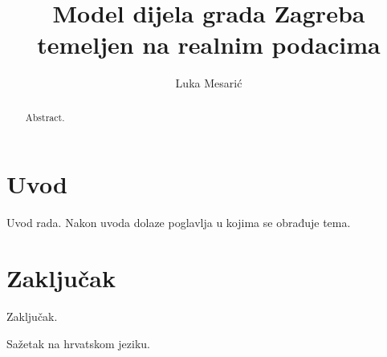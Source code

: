 \documentclass[times, utf8, zavrsni, numeric]{fer}
\begin{document}
\nocite{*}


\title{Model dijela grada Zagreba temeljen na realnim podacima}

\author{Luka Mesarić}

\maketitle

\izvornik

\zahvala{}

\tableofcontents

\chapter{Uvod}
Uvod rada. Nakon uvoda dolaze poglavlja u kojima se obrađuje tema.

\chapter{Zaključak}
Zaključak.




\begin{sazetak}
Sažetak na hrvatskom jeziku.

\end{sazetak}

\begin{abstract}
Abstract.

\end{abstract}
\end{document}
